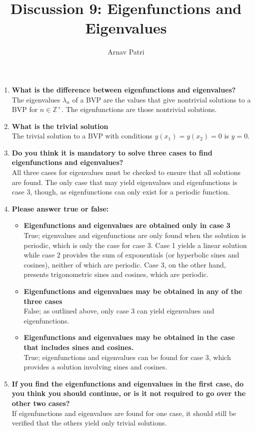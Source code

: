 \documentclass[12pt]{article}
\title{Discussion 9: Eigenfunctions and Eigenvalues}
\author{Arnav Patri}
\newcommand{\Z}{\mathbb{Z}}
\begin{document}
	\maketitle
	\thispagestyle{empty}
	\begin{enumerate}
		\item \textbf{What is the difference between eigenfunctions and eigenvalues?} \\
			The eigenvalues \(\lambda_n\) of a BVP are the values that give nontrivial solutions to a BVP for \(n \in \Z^+\). The eigenfunctions are those nontrivial solutions. \\
		\item \textbf{What is the trivial solution} \\
			The trivial solution to a BVP with conditions \(y(x_1) = y(x_2) = 0\) is \(y = 0\).
		\item \textbf{Do you think it is mandatory to solve three cases to find eigenfunctions and eigenvalues?} \\
			All three cases for eigenvalues must be checked to ensure that all solutions are found. The only case that may yield eigenvalues and eigenfunctions is case 3, though, as eigenfunctions can only exist for a periodic function.
		\item \textbf{Please answer true or false:}
			\begin{itemize}
				\item \textbf{Eigenfunctions and eigenvalues are obtained only in case 3} \\
					True; eigenvalues and eigenfunctions are only found when the solution is periodic, which is only the case for case 3. Case 1 yields a linear solution while case 2 provides the sum of exponentials (or hyperbolic sines and cosines), neither of which are periodic. Case 3, on the other hand, presents trigonometric sines and cosines, which are periodic.
				\item \textbf{Eigenfunctions and eigenvalues may be obtained in any of the three cases} \\
					False; as outlined above, only case 3 can yield eigenvalues and eigenfunctions.
				\item \textbf{Eigenfunctions and eigenvalues may be obtained in the case that includes sines and cosines.} \\
					True; eigenfunctions and eigenvalues can be found for case 3, which provides a solution involving sines and cosines.
			\end{itemize}
		\item \textbf{If you find the eigenfunctions and eigenvalues in the first case, do you think you should continue, or is it not required to go over the other two cases?} \\
			If eigenfunctions and eigenvalues are found for one case, it should still be verified that the others yield only trivial solutions.
	\end{enumerate}
\end{document}
